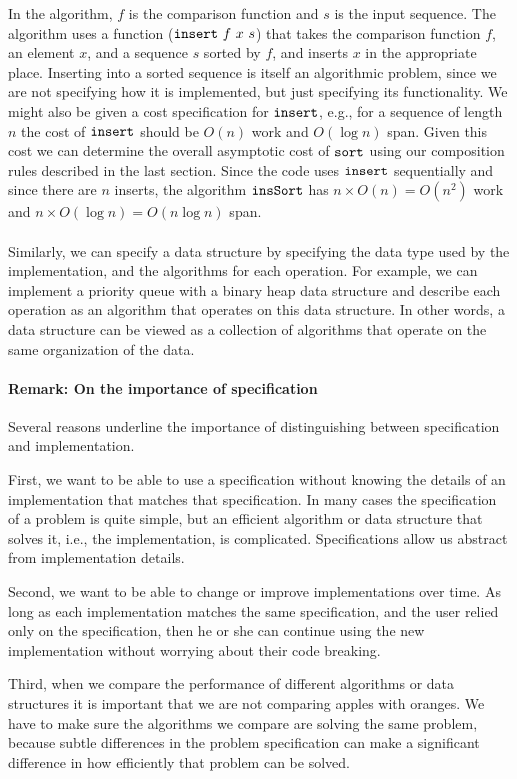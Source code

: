 In the algorithm, $f$ is the comparison function and $s$ is the input
sequence. %
The algorithm uses a function ($\texttt{insert}~f~x~s$) that
takes the comparison function $f$, an element $x$, and a sequence $s$
sorted by $f$, and inserts $x$ in the appropriate place.  
%
Inserting into a sorted sequence is itself an algorithmic problem,
since we are not specifying how it is implemented, but just specifying
its functionality.  
%
We might also be given a cost specification for $\texttt{insert}$, e.g., for
a sequence of length $n$ the cost of $\texttt{insert}$ should be $O(n)$
work and $O(\log n)$ span.  
%
Given this cost we can determine the overall asymptotic cost of
$\texttt{sort}$ using our composition rules described in the last section.
%
Since the code uses $\texttt{insert}$ sequentially and since there are $n$
inserts, the algorithm $\texttt{insSort}$ has $n \times O(n) =
O(n^2)$ work and $n \times O(\log n) = O(n \log n)$ span.

\paragraph{}
Similarly, we can specify a data structure by specifying the data type
used by the implementation, and the algorithms for each operation.
%
For example, we can implement a priority queue with a binary heap data
structure and describe each operation as an algorithm that operates on
this data structure.  In other words, a data structure can be viewed
as a collection of algorithms that operate on the same organization
of the data.

\paragraph{Remark: On the importance of specification}
Several reasons underline the importance of distinguishing between
specification and implementation.  

First, we want to be able to use a specification without knowing the
details of an implementation that matches that specification.
%
In many cases the specification of a problem is quite simple, but an
efficient algorithm or data structure that solves it, i.e., the
implementation, is complicated.  
%
Specifications allow us abstract from implementation details.
%

Second, we want to be able to change or improve implementations over
time.  As long as each implementation matches the same specification,
and the user relied only on the specification, then he or she can
continue using the new implementation without worrying about their
code breaking. 
%

Third, when we compare the performance of different
algorithms or data structures it is important that we are not
comparing apples with oranges.  We have to make sure the algorithms we
compare are solving the same problem, because subtle differences in
the problem specification can make a significant difference in how
efficiently that problem can be solved.
